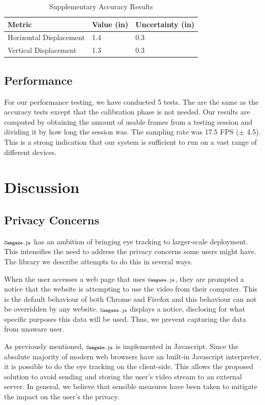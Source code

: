 \documentclass[annual]{acmsiggraph}
\newcommand{\Acronym}[1]{\ensuremath{{\small{\texttt{#1}}}}}
\newcommand{\Name}{\Acronym{Camgaze.js}} \newcommand{\False}{\Constant{false}}
\newcommand{\Constant}[1]{\ensuremath{\small{\texttt{#1}}}}
\begin{document}
\begin{table} \caption{Supplementary Accuracy Results} \begin{tabular}{l|l|l}
\textbf{Metric}                        & \textbf{Value} (in) &
\textbf{Uncertainty} (in) \\ \hline Horizontal Displacement & 1.4 & 0.3 \\
Vertical Displacement         & 1.3 & 0.3 \\ \end{tabular} \end{table}

\subsection{Performance}

For our performance testing, we have conducted 5 tests. The are the same as the
accuracy tests except that the calibration phase is not needed. Our results are
computed by obtaining the amount of usable frames from a testing session and
dividing it by how long the session was. The sampling rate was 17.5 FPS ($\pm$
4.5). This is a strong indication that our system is sufficient to run on a
vast range of different devices.

\section{Discussion}

\subsection{Privacy Concerns}

$\Name$ has an ambition of bringing eye tracking to larger-scale deployment.
This intensifies the need to address the privacy concerns some users might
have. The library we describe attempts to do this in several ways.

When the user accesses a web page that uses $\Name$, they are prompted a
notice that the website is attempting to use the video from their computer.
This is the default behaviour of both Chrome and Firefox and this behaviour can
not be overridden by any website. $\Name$ displays a notice, disclosing for
what specific purposes this data will be used. Thus, we prevent capturing the
data from unaware user.

As previously mentioned, $\Name$ is implemented in Javascript. Since the
absolute majority of modern web browsers have an built-in Javascript
interpreter, it is possible to do the eye tracking on the client-side. This
allows the proposed solution to avoid sending and storing the user’s video
stream to an external server. In general, we believe that sensible measures
have been taken to mitigate the impact on the user’s the privacy.
\end{document}
